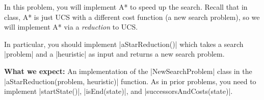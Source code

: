 \item {}

In this problem, you will implement A* to speed up the search. Recall that in class, A* is just UCS with a different cost function (a new search problem), so we will implement A* via a \textit{reduction} to UCS.

In particular, you should implement |aStarReduction()| which takes a search |problem| and a |heuristic| as input and returns a new search problem.

\textbf{What we expect: } An implementation of the |NewSearchProblem| class in the |aStarReduction(problem, heuristic)| function. As in prior problems, you need to implement |startState()|, |isEnd(state)|, and |successorsAndCosts(state)|.
  